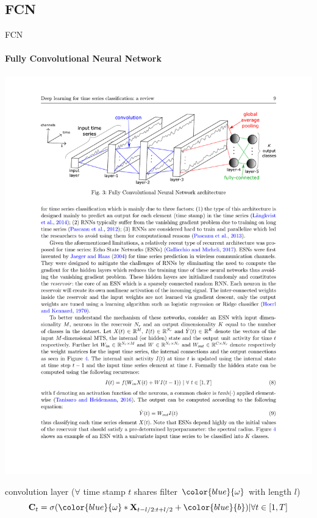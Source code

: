 \documentclass[aspectratio=169]{ctexbeamer}
\begin{document}
\subsection{FCN}
\begin{frame}{FCN}
	\framesubtitle{Fully Convolutional Neural Network}
	\begin{center}
		\includegraphics[width=\textwidth]{figure/fcnn}
	\end{center}
	convolution layer ($\forall$ time stamp $t$ shares filter $\color{blue}{\omega}$ with length $l$)
	$$\mathbf{C}_t = \sigma ({\color{blue}{\omega}}* \mathbf{X}_{t-l/2:t+l/2} + {\color{blue}{b}}) | \forall t \in [1,T ]$$
\end{frame}
\end{document}
